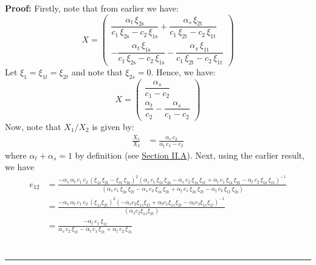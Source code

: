 \documentclass[11pt,a4paper,leqno]{extarticle}
\newenvironment{proof}[1][Proof]{\noindent\textbf{#1:} }{\ \rule{0.5em}{0.5em}}
\begin{document}
	
	
	\begin{proof}
		Firstly, note that from earlier we have:
		$$
		X = \begin{pmatrix}
		\dfrac{\alpha _{t}\,\xi _{\mathrm{2s}}}{c_{1}\,\xi _{\mathrm{2s}}-c_{2}\,\xi _{\mathrm{1s}}}+\dfrac{\alpha _{s}\,\xi _{\mathrm{2t}}}{c_{1}\,\xi _{\mathrm{2t}}-c_{2}\,\xi _{\mathrm{1t}}} \\[2ex] 
		-\dfrac{\alpha _{t}\,\xi _{\mathrm{1s}}}{c_{1}\,\xi _{\mathrm{2s}}-c_{2}\,\xi _{\mathrm{1s}}}-\dfrac{\alpha _{s}\,\xi _{\mathrm{1t}}}{c_{1}\,\xi _{\mathrm{2t}}-c_{2}\,\xi _{\mathrm{1t}}}
		\end{pmatrix}
		$$
		Let $\xi_1 = \xi_{1t} = \xi_{2t}$ and note that $\xi_{2s} = 0$. Hence, we have:
		$$
		X = \begin{pmatrix}
		\dfrac{\alpha_s}{c_1 - c_2} \\[2ex] 
		\dfrac{\alpha_t}{c_2} - \dfrac{\alpha_s}{c_1 - c_2}
		\end{pmatrix}
		$$
		Now, note that $X_1/X_2$ is given by:
		\begin{align*}
		\frac{X_1}{X_2} &= \frac{\alpha _{s}\,c_{2}}{\alpha _{t}\,c_{1} - c_2}
		\end{align*}
		where $\alpha_t + \alpha_s = 1$ by definition (see \hyperref[sec:consumers]{Section II.A}).  Next, using the earlier result, we have
		\begin{align*}
		e_{12} &= 
		\frac{-\alpha _{s}\,\alpha _{t}\,c_{1}\,c_{2}\,{\left(\xi _{\mathrm{1s}}\,\xi _{\mathrm{2t}}-\xi _{\mathrm{1t}}\,\xi _{\mathrm{2s}}\right)}^2 \left(\alpha _{s}\,c_{1}\,\xi _{\mathrm{1t}}\,\xi _{\mathrm{2s}}-\alpha _{s}\,c_{2}\,\xi _{\mathrm{1s}}\,\xi _{\mathrm{1t}}+\alpha _{t}\,c_{1}\,\xi _{\mathrm{1s}}\,\xi _{\mathrm{2t}}-\alpha _{t}\,c_{2}\,\xi _{\mathrm{1s}}\,\xi _{\mathrm{1t}}\right)^{-1}}{
			\,\left(\alpha _{s}\,c_{1}\,\xi _{\mathrm{2s}}\,\xi _{\mathrm{2t}}-\alpha _{s}\,c_{2}\,\xi _{\mathrm{1s}}\,\xi _{\mathrm{2t}}+\alpha _{t}\,c_{1}\,\xi _{\mathrm{2s}}\,\xi _{\mathrm{2t}}-\alpha _{t}\,c_{2}\,\xi _{\mathrm{1t}}\,\xi _{\mathrm{2s}}\right)
		}\\
		&= \frac{-\alpha_s \, \alpha_t \, c_1 \, c_2 \, (\xi_{1s} \xi_{2t})^2 ( -\alpha_s c_2 \xi_{1s} \xi_{1t} + \alpha_t c_1 \xi_{1s} \xi_{2t} - \alpha_t c_2 \xi_{1s} \xi_{1t})^{-1}}{
		( \alpha_s c_2 \xi_{1s} \xi_{2t})		
		} \\
		&= 
		\frac{-\alpha _{t}\,c_{1}\,\xi _{\mathrm{1t}}}{\alpha _{s}\,c_{2}\,\xi _{\mathrm{1t}}-\alpha _{t}\,c_{1}\,\xi _{\mathrm{1t}}+\alpha _{t}\,c_{2}\,\xi _{\mathrm{1t}}} \\

\end{align*}
\end{proof}
\end{document}
